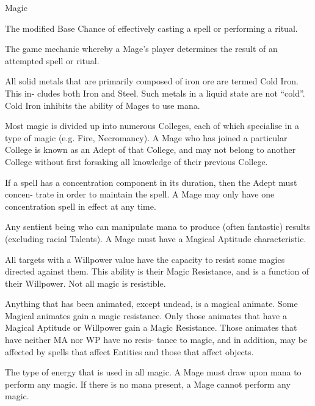 \begin{Chapter}{Magic}
\begin{Description}
\item[Cast Chance] The modified Base Chance of effectively casting a
  spell or performing a ritual.

\item[Cast Check] The game mechanic whereby a Mage’s player determines
  the result of an attempted spell or ritual.

\item[Cold Iron] All solid metals that are primarily composed of iron
  ore are termed Cold Iron.  This in- cludes both Iron and Steel. Such
  metals in a liquid state are not “cold”. Cold Iron inhibits the
  ability of Mages to use mana.

\item[College ] Most magic is divided up into numerous Colleges, each
  of which specialise in a type of magic (e.g.  Fire, Necromancy).  A
  Mage who has joined a particular College is known as an Adept of
  that College, and may not belong to another College without first
  forsaking all knowledge of their previous College.

\item[Concentration] If a spell has a concentration component in its
  duration, then the Adept must concen- trate in order to maintain the
  spell.  A Mage may only have one concentration spell in effect at
  any time.

\item[Mage] Any sentient being who can manipulate mana to produce
  (often fantastic) results (excluding racial Talents). A Mage must
  have a Magical Aptitude characteristic.

\item[Magic Resistance] All targets with a Willpower value have the
  capacity to resist some magics directed against them.  This ability
  is their Magic Resistance, and is a function of their Willpower.
  Not all magic is resistible.

\item[Magical Animates] Anything that has been animated, except
  undead, is a magical animate. Some Magical animates gain a magic
  resistance.  Only those animates that have a Magical Aptitude or
  Willpower gain a Magic Resistance.  Those animates that have
  neither MA nor WP have no resis- tance to magic, and in addition,
  may be affected by spells that affect Entities and those that affect
  objects.

\item[Mana] The type of energy that is used in all magic.  A Mage must
  draw upon mana to perform any magic.  If there is no mana present, a
  Mage cannot perform any magic.


\end{Description}
\end{Chapter}

